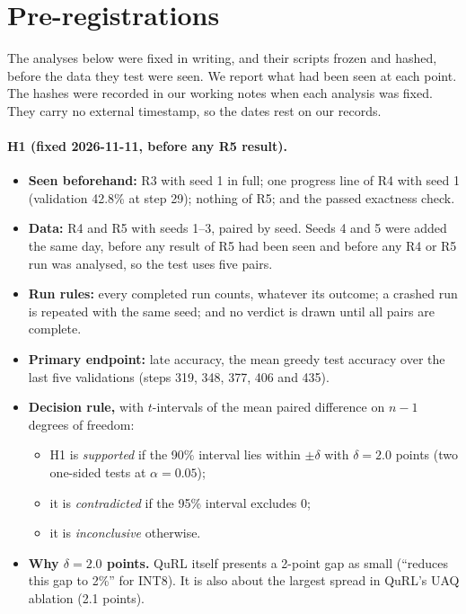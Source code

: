 \section{Pre-registrations}\label{app:prereg}

The analyses below were fixed in writing, and their scripts frozen and hashed, before the data they test were seen. We report what had been seen at each point. The hashes were recorded in our working notes when each analysis was fixed. They carry no external timestamp, so the dates rest on our records.

\paragraph{H1 (fixed 2026-11-11, before any R5 result).}
\begin{itemize}[leftmargin=*,itemsep=2pt]
\item \textbf{Seen beforehand:} R3 with seed 1 in full; one progress line of R4 with seed 1 (validation 42.8\% at step 29); nothing of R5; and the passed exactness check.
\item \textbf{Data:} R4 and R5 with seeds 1--3, paired by seed. Seeds 4 and 5 were added the same day, before any result of R5 had been seen and before any R4 or R5 run was analysed, so the test uses five pairs.
\item \textbf{Run rules:} every completed run counts, whatever its outcome; a crashed run is repeated with the same seed; and no verdict is drawn until all pairs are complete.
\item \textbf{Primary endpoint:} late accuracy, the mean greedy test accuracy over the last five validations (steps 319, 348, 377, 406 and 435).
\item \textbf{Decision rule,} with $t$-intervals of the mean paired difference on $n-1$ degrees of freedom:
  \begin{itemize}[leftmargin=*,itemsep=1pt]
  \item H1 is \emph{supported} if the 90\% interval lies within $\pm\delta$ with $\delta=2.0$ points (two one-sided tests at $\alpha=0.05$);
  \item it is \emph{contradicted} if the 95\% interval excludes 0;
  \item it is \emph{inconclusive} otherwise.
  \end{itemize}
\item \textbf{Why $\delta=2.0$ points.} QuRL itself presents a 2-point gap as small (``reduces this gap to 2\%'' for INT8). It is also about the largest spread in QuRL's UAQ ablation (2.1 points).

\end{itemize}
